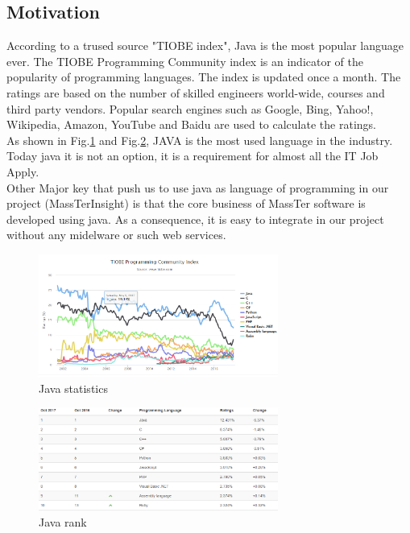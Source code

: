 \subsection{Motivation}
According to a trused source "TIOBE index", Java is the most popular language ever.
The TIOBE Programming Community index \cite{ref7} is an indicator of the popularity of programming languages. The index is updated once a month. The ratings are based on the number of skilled engineers world-wide, courses and third party vendors. Popular search engines such as Google, Bing, Yahoo!, Wikipedia, Amazon, YouTube and Baidu are used to calculate the ratings.
\\
As shown in Fig.\ref{JavaStatics}  and Fig.\ref{JavaRank}, JAVA is the most used language in the industry. Today java it is not an option, it is a requirement for almost all the IT Job Apply. \\Other Major key that push us to use java as language of programming in our project (MassTerInsight) is that the core business of MassTer software is developed using java. As a consequence, it is easy to integrate in our project without any midelware or such web services.
	\begin{figure}[!h]
	\centering
	\includegraphics[width=0.7\textwidth]{Java_statics.png}
	\caption{Java statistics}
	\label{JavaStatics}
    \end{figure}
	\begin{figure}[!h]
	\centering
	\includegraphics[width=0.7\textwidth]{Java_rank.png}
	\caption{Java rank}
	\label{JavaRank}
    \end{figure}
 
 
\clearpage
\newpage

